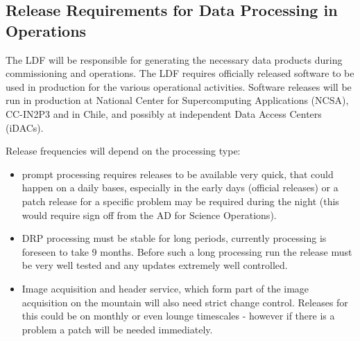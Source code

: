 %


\subsection{Release Requirements for Data Processing in Operations} \label{sec:procreqs}


The \gls{LDF} will be responsible for generating the necessary data products during commissioning and operations. 
The \gls{LDF} requires officially released software to be used in production for the various operational activities.
Software releases will be run in production at National \gls{Center} for Supercomputing Applications (\gls{NCSA}), CC-IN2P3 and in Chile, and possibly at independent Data Access Centers (iDACs).

Release frequencies will depend on the processing type:
\begin{itemize}
\item prompt processing requires releases to be available very quick, that could happen on a daily bases, especially in the early days (official releases)
 or a  \gls{patch} release  for a specific problem may be required during the night (this would require sign off from the \gls{AD} for Science \gls{Operations}).
\item \gls{DRP} processing  must be stable for long periods, currently processing is foreseen to take 9 months.  Before such a long processing run the release must be very well tested and any updates extremely well controlled.
\item Image acquisition and header service, which form part of the image acquisition on the mountain will also need strict change control. Releases for this could be on monthly or even lounge timescales - however if there is a problem a \gls{patch} will be needed immediately.
\end{itemize}


